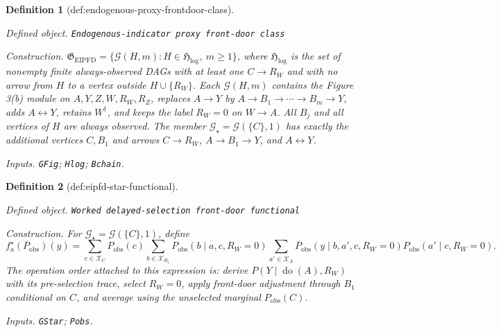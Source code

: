 \documentclass{article}
\newtheorem{definition}{Definition}
\begin{document}
\begin{definition}[def:endogenous-proxy-frontdoor-class]\label{def:endogenous-proxy-frontdoor-class}
\par\smallskip\noindent\emph{Defined object.} \texttt{Endogenous-\allowbreak{}indicator proxy front-\allowbreak{}door class}
\par\smallskip\noindent\emph{Construction.} \(\mathfrak G_{\mathrm{EIPFD}}=\{\mathcal G(H,m):H\in\mathfrak H_{\mathrm{log}},\ m\geq1\}\), where \(\mathfrak H_{\mathrm{log}}\) is the set of nonempty finite always-observed DAGs with at least one \(C\to R_W\) and with no arrow from \(H\) to a vertex outside \(H\cup\{R_W\}\). Each \(\mathcal G(H,m)\) contains the Figure 3(b) module on \(A,Y,Z,W,R_W,R_Z\), replaces \(A\to Y\) by \(A\to B_1\to\cdots\to B_m\to Y\), adds \(A\leftrightarrow Y\), retains \(W^{\dagger}\), and keeps the label \(R_W=0\) on \(W\to A\). All \(B_j\) and all vertices of \(H\) are always observed. The member \(\mathcal G_\star=\mathcal G(\{C\},1)\) has exactly the additional vertices \(C,B_1\) and arrows \(C\to R_W\), \(A\to B_1\to Y\), and \(A\leftrightarrow Y\).
\par\smallskip\noindent\emph{Inputs.} \texttt{GFig}; \texttt{Hlog}; \texttt{Bchain}.
\end{definition}

\begin{definition}[def:eipfd-star-functional]\label{def:eipfd-star-functional}
\par\smallskip\noindent\emph{Defined object.} \texttt{Worked delayed-\allowbreak{}selection front-\allowbreak{}door functional}
\par\smallskip\noindent\emph{Construction.} For \(\mathcal G_\star=\mathcal G(\{C\},1)\), define \[f_a^\star(P_{\mathrm{obs}})(y)=\sum_{c\in\mathcal X_C}P_{\mathrm{obs}}(c)\sum_{b\in\mathcal X_{B_1}}P_{\mathrm{obs}}(b\mid a,c,R_W=0)\sum_{a'\in\mathcal X_A}P_{\mathrm{obs}}(y\mid b,a',c,R_W=0)P_{\mathrm{obs}}(a'\mid c,R_W=0).\] The operation order attached to this expression is: derive \(P(Y\mid\operatorname{do}(A),R_W)\) with its pre-selection trace, select \(R_W=0\), apply front-door adjustment through \(B_1\) conditional on \(C\), and average using the unselected marginal \(P_{\mathrm{obs}}(C)\).
\par\smallskip\noindent\emph{Inputs.} \texttt{GStar}; \texttt{Pobs}.
\end{definition}
\end{document}
